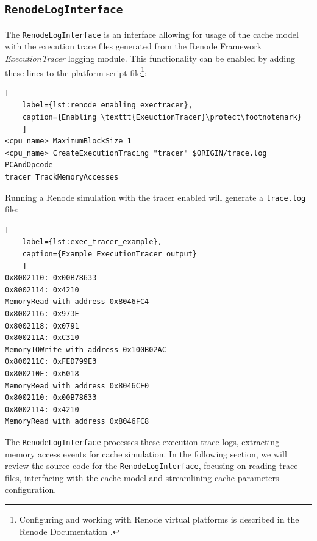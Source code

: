 \subsection{\texttt{RenodeLogInterface}}

The \texttt{RenodeLogInterface} is an interface allowing for usage of the cache model with the execution trace files generated from the Renode Framework \textit{ExecutionTracer} logging module.
This functionality can be enabled by adding these lines to the platform script file\footnote{Configuring and working with Renode virtual platforms is described in the
Renode Documentation \cite{renoderescdocs}.}:

\begin{center}
\centering
\begin{minipage}{\linewidth}
\begin{lstlisting}[
    label={lst:renode_enabling_exectracer},
    caption={Enabling \texttt{ExeuctionTracer}\protect\footnotemark}
    ]
<cpu_name> MaximumBlockSize 1
<cpu_name> CreateExecutionTracing "tracer" $ORIGIN/trace.log PCAndOpcode
tracer TrackMemoryAccesses
\end{lstlisting}
\end{minipage}
\end{center}

\noindent Running a Renode simulation with the tracer enabled will generate a \texttt{trace.log} file:
\begin{center}
\centering
\begin{minipage}{\linewidth}
\begin{lstlisting}[
    label={lst:exec_tracer_example},
    caption={Example ExecutionTracer output}
    ]
0x8002110: 0x00B78633
0x8002114: 0x4210
MemoryRead with address 0x8046FC4
0x8002116: 0x973E
0x8002118: 0x0791
0x800211A: 0xC310
MemoryIOWrite with address 0x100B02AC
0x800211C: 0xFED799E3
0x800210E: 0x6018
MemoryRead with address 0x8046CF0
0x8002110: 0x00B78633
0x8002114: 0x4210
MemoryRead with address 0x8046FC8
\end{lstlisting}
\end{minipage}
\end{center}

\noindent The \texttt{RenodeLogInterface} processes these execution trace logs, extracting memory access events for cache simulation. In the following section, we will review
the source code for the \texttt{RenodeLogInterface}, focusing on reading trace files, interfacing with the cache model and streamlining cache parameters configuration.

